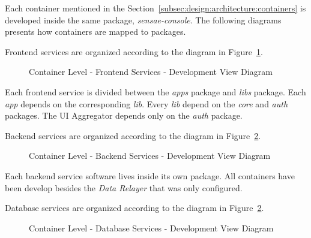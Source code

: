 Each container mentioned in the Section~\ref{subsec:design:architecture:containers} is developed inside the same package, \textit{sensae-console}. The following diagrams presents how containers are mapped to packages.

Frontend services are organized according to the diagram in Figure~\ref{fig:design:architecture:container:process:diagram:development:frontend}.

\begin{figure}[H]
   \centering
   \resizebox{\columnwidth}{!}
   {
      
   }
   \caption[Container Level - Frontend Services - Development View Diagram]{Container Level - Frontend Services - Development View Diagram}
   \label{fig:design:architecture:container:process:diagram:development:frontend}
\end{figure}

Each frontend service is divided between the \textit{apps} package and \textit{libs} package. Each \textit{app} depends on the corresponding \textit{lib}. Every \textit{lib} depend on the \textit{core} and \textit{auth} packages. The UI Aggregator depends only on the \textit{auth} package.

Backend services are organized according to the diagram in Figure~\ref{fig:design:architecture:container:process:diagram:development:backend}.

\begin{figure}[H]
   \centering
   \resizebox{\columnwidth}{!}
   {
      
   }
   \caption[Container Level - Backend Services - Development View Diagram]{Container Level - Backend Services - Development View Diagram}
   \label{fig:design:architecture:container:process:diagram:development:backend}
\end{figure}

Each backend service software lives inside its own package. All containers have been develop besides the \textit{Data Relayer} that was only configured.

Database services are organized according to the diagram in Figure~\ref{fig:design:architecture:container:process:diagram:development:backend}.

\begin{figure}[H]
   \centering
   \resizebox{\columnwidth}{!}
   {
      
   }
   \caption[Container Level - Database Services - Development View Diagram]{Container Level - Database Services - Development View Diagram}
   \label{fig:design:architecture:container:process:diagram:development:database}
\end{figure}

